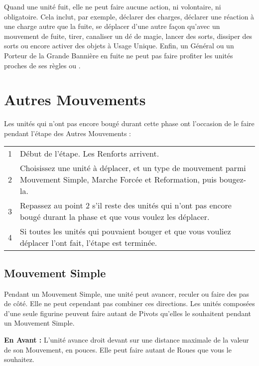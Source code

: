Quand une unité fuit, elle ne peut faire aucune action, ni volontaire, ni obligatoire. Cela inclut, par exemple, déclarer des charges, déclarer une réaction à une charge autre que la fuite, se déplacer d'une autre façon qu'avec un mouvement de fuite, tirer, canaliser un dé de magie, lancer des sorts, dissiper des sorts ou encore activer des objets à Usage Unique. Enfin, un Général ou un Porteur de la Grande Bannière en fuite ne peut pas faire profiter les unités proches de ses règles \inspiringpresence{} ou \holdyourground{}.

\newpage
\hypertarget{remainingmoves}{\section{Autres Mouvements}}

Les unités qui n'ont pas encore bougé durant cette phase ont l'occasion de le faire pendant l'étape des Autres Mouvements :

\hspace*{0.3cm}
\begin{tabular}{c|m{12cm}}
1 & Début de l'étape. Les Renforts arrivent.\tabularnewline
2 & Choisissez une unité à déplacer, et un type de mouvement parmi Mouvement Simple, Marche Forcée et Reformation, puis bougez-la.\tabularnewline
3 & Repassez au point 2 s'il reste des unités qui n'ont pas encore bougé durant la phase et que vous voulez les déplacer.\tabularnewline
4 & Si toutes les unités qui pouvaient bouger et que vous vouliez déplacer l'ont fait, l'étape est terminée.\tabularnewline
\end{tabular}

\hypertarget{advancemove}{\subsection{Mouvement Simple}}

Pendant un Mouvement Simple, une unité peut avancer, reculer ou faire des pas de côté. Elle ne peut cependant pas combiner ces directions. Les unités composées d'une seule figurine peuvent faire autant de Pivots qu'elles le souhaitent pendant un Mouvement Simple. 

\noindent\textbf{En Avant :} L'unité avance droit devant sur une distance maximale de la valeur de son Mouvement, en pouces. Elle peut faire autant de Roues que vous le souhaitez.

